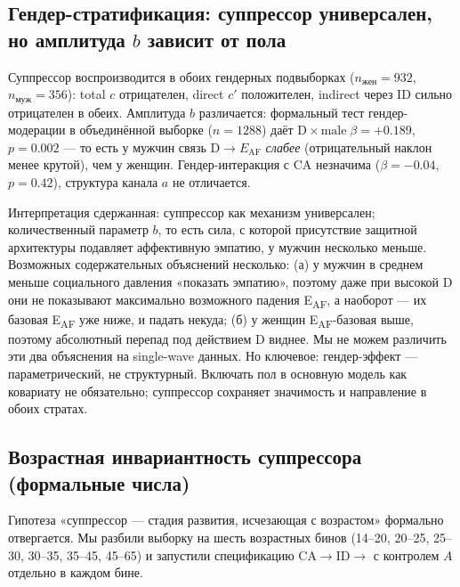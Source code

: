 \subsection{Гендер-стратификация: суппрессор универсален, но амплитуда $b$ зависит от пола}
\label{subsec:gender_moderation}

Суппрессор воспроизводится в обоих гендерных подвыборках ($n_\mathrm{жен} = 932$, $n_\mathrm{муж} = 356$): total $c$ отрицателен, direct $c'$ положителен, indirect через ID сильно отрицателен в обеих. Амплитуда $b$ различается: формальный тест гендер-модерации в объединённой выборке ($n = 1288$) даёт $\mathrm{D}\times\mathrm{male} \; \beta = +0.189$, $p = 0.002$ --- то есть у мужчин связь $\mathrm{D} \to E_{\mathrm{AF}}$ \emph{слабее} (отрицательный наклон менее крутой), чем у женщин. Гендер-интеракция с CA незначима ($\beta = -0.04$, $p = 0.42$), структура канала $a$ не отличается.

Интерпретация сдержанная: суппрессор как механизм универсален; количественный параметр $b$, то есть сила, с которой присутствие защитной архитектуры подавляет аффективную эмпатию, у мужчин несколько меньше. Возможных содержательных объяснений несколько: (а) у мужчин в среднем меньше социального давления «показать эмпатию», поэтому даже при высокой D они не показывают максимально возможного падения E\textsubscript{AF}, а наоборот --- их базовая E\textsubscript{AF} уже ниже, и падать некуда; (б) у женщин E\textsubscript{AF}-базовая выше, поэтому абсолютный перепад под действием D виднее. Мы не можем различить эти два объяснения на single-wave данных. Но ключевое: гендер-эффект --- параметрический, не структурный. Включать пол в основную модель как ковариату не обязательно; суппрессор сохраняет значимость и направление в обоих стратах.

\subsection{Возрастная инвариантность суппрессора (формальные числа)}
\label{subsec:age_invariance_numbers}

Гипотеза «суппрессор --- стадия развития, исчезающая с возрастом» формально отвергается. Мы разбили выборку на шесть возрастных бинов (14--20, 20--25, 25--30, 30--35, 35--45, 45--65) и запустили спецификацию CA$\to$ID$\to$\EAF{} с контролем $A$ отдельно в каждом бине.

